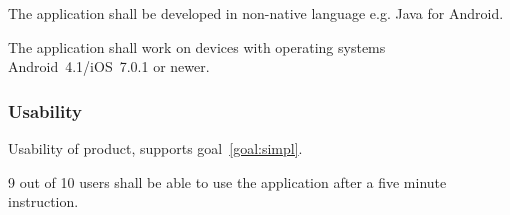 \documentclass[10pt,a4paper]{article}
\begin{document}
\begin{description}
	\item [Req \thesubsubsection {.\themapo} Language] The application shall be developed in non-native language e.g. Java for Android. 
	\item [Req \thesubsubsection {.\themapo} Device support] The application shall work on devices with operating systems Android~4.1/iOS~7.0.1 or newer.
\end{description}

\subsubsection{Usability}
Usability of product, supports goal~\ref{goal:simpl}.
\begin{description}
	\item [Req \thesubsubsection {.\theusab} User friendly] 9 out of 10 users shall be able to use the application after a five minute instruction.
\end{description}








\end{document}
